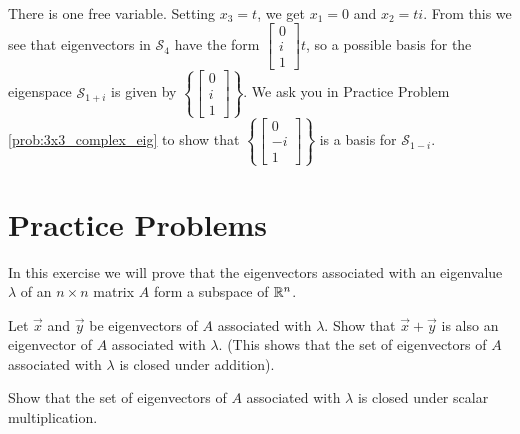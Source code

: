 \documentclass{ximera}
\begin{document}
\begin{example}
\begin{explanation}
\begin{align*}
\end{align*}
There is one free variable.  Setting $x_3=t$, we get $x_1=0$ and $x_2=ti$.  From this we see that eigenvectors in $\mathcal{S}_4$ have the form $\begin{bmatrix}0\\i\\1\end{bmatrix}t$, so a possible basis for the eigenspace $\mathcal{S}_{1+i}$ is given by $\left\{\begin{bmatrix}0\\i\\1\end{bmatrix}\right\}$.
We ask you in Practice Problem \ref{prob:3x3_complex_eig} to show that $\left\{\begin{bmatrix}0\\-i\\1\end{bmatrix}\right\}$ is a basis for $\mathcal{S}_{1-i}$.
\end{explanation}
\end{example}

\section*{Practice Problems}

\begin{problem}\label{prob:eigenspace}
In this exercise we will prove that the eigenvectors associated with an eigenvalue $\lambda$ of an $n \times n$ matrix $A$ form a subspace of $\mathbb{R}^n$.
\begin{problem}
Let $\vec{x}$ and $\vec{y}$ be eigenvectors of $A$ associated with $\lambda$.  Show that $\vec{x}+\vec{y}$ is also an eigenvector of $A$ associated with $\lambda$.  (This shows that the set of eigenvectors of $A$ associated with $\lambda$ is closed under addition).
\end{problem}
\begin{problem}
Show that the set of eigenvectors of $A$ associated with $\lambda$ is closed under scalar multiplication.
\end{problem}
\end{problem}
\end{document}
